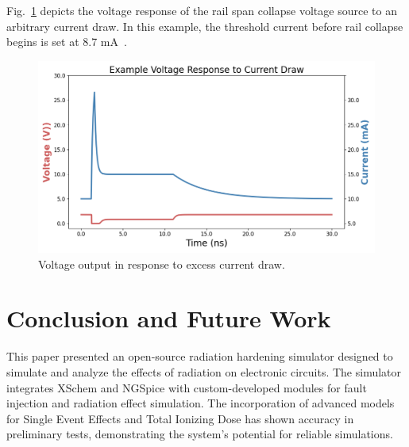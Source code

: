 \documentclass[conference]{IEEEtran}
\begin{document}

    Fig.~\ref{fig:rail_collapse_response} depicts the voltage response of the rail span collapse voltage source to an arbitrary current draw.
    In this example, the threshold current before rail collapse begins is set at 8.7 mA~\cite{Massengill1984}.

    \begin{figure}[htbp]
        \centering
        \includegraphics[width=0.95\linewidth]{Rail_Collapse_Response}
        \caption{Voltage output in response to excess current draw.}
        \label{fig:rail_collapse_response}
    \end{figure}




    \section{Conclusion and Future Work}\label{sec:conclusion-and-future-work}
    This paper presented an open-source radiation hardening simulator designed to simulate and analyze the effects of radiation on electronic circuits.
    The simulator integrates XSchem and NGSpice with custom-developed modules for fault injection and radiation effect simulation.
    The incorporation of advanced models for Single Event Effects and Total Ionizing Dose has shown accuracy in preliminary tests, demonstrating the system's potential for reliable simulations.
\end{document}
